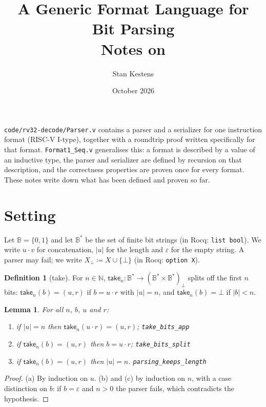 \documentclass[11pt,a4paper]{article}
\title{A Generic Format Language for Bit Parsing\\[4pt]
\large Notes on \code{code/format-lib/Format1\_Seq.v}}
\author{Stan Kestens}
\date{October 2026}
\theoremstyle{plain}
\newtheorem{lemma}[theorem]{Lemma}
\theoremstyle{definition}
\newtheorem{definition}[theorem]{Definition}
\theoremstyle{remark}
\newcommand{\B}{\mathbb{B}}
\newcommand{\N}{\mathbb{N}}
\newcommand{\fail}{\bot}
\newcommand{\take}{\mathsf{take}}
\newcommand{\code}[1]{\texttt{#1}}
\begin{document}
\maketitle

\noindent \code{code/rv32-decode/Parser.v} contains a parser and a serializer for one instruction format (RISC-V I-type), together with a roundtrip proof written specifically for that format. \code{Format1\_Seq.v} generalises this: a format is described by a value of an inductive type, the parser and serializer are defined by recursion on that description, and the correctness properties are proven once for every format. These notes write down what has been defined and proven so far.

\section{Setting}

Let $\B=\{0,1\}$ and let $\B^*$ be the set of finite bit strings (in Rocq: \code{list bool}). We write $u\cdot v$ for concatenation, $|u|$ for the length and $\varepsilon$ for the empty string. A parser may fail; we write $X_\fail \coloneqq X\cup\{\fail\}$ (in Rocq: \code{option X}).

\begin{definition}[take]
For $n\in\N$, $\take_n:\B^*\to(\B^*\times\B^*)_\fail$ splits off the first $n$ bits:
$\take_n(b)=(u,r)$ if $b=u\cdot r$ with $|u|=n$, and $\take_n(b)=\fail$ if $|b|<n$.
\end{definition}

\begin{lemma}\label{lem:take}
For all $n$, $b$, $u$ and $r$:
\begin{enumerate}[label=(\alph*)]
\item if $|u|=n$ then $\take_n(u\cdot r)=(u,r)$; \hfill\code{take\_bits\_app}
\item if $\take_n(b)=(u,r)$ then $b=u\cdot r$; \hfill\code{take\_bits\_split}
\item if $\take_n(b)=(u,r)$ then $|u|=n$. \hfill\code{parsing\_keeps\_length}
\end{enumerate}
\end{lemma}
\begin{proof}
(a) By induction on $u$. (b) and (c) by induction on $n$, with a case distinction on $b$: if $b=\varepsilon$ and $n>0$ the parser fails, which contradicts the hypothesis.
\end{proof}
\end{document}
